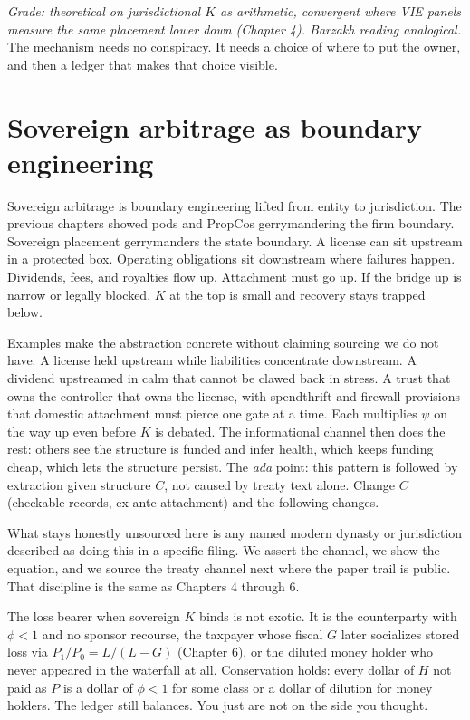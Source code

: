 \textit{Grade: theoretical on jurisdictional $K$ as arithmetic, convergent where VIE panels measure the same placement lower down (Chapter 4). Barzakh reading analogical.} The mechanism needs no conspiracy. It needs a choice of where to put the owner, and then a ledger that makes that choice visible.

\section{Sovereign arbitrage as boundary engineering}

Sovereign arbitrage is boundary engineering lifted from entity to jurisdiction. The previous chapters showed pods and PropCos gerrymandering the firm boundary. Sovereign placement gerrymanders the state boundary. A license can sit upstream in a protected box. Operating obligations sit downstream where failures happen. Dividends, fees, and royalties flow up. Attachment must go up. If the bridge up is narrow or legally blocked, $K$ at the top is small and recovery stays trapped below.

Examples make the abstraction concrete without claiming sourcing we do not have. A license held upstream while liabilities concentrate downstream. A dividend upstreamed in calm that cannot be clawed back in stress. A trust that owns the controller that owns the license, with spendthrift and firewall provisions that domestic attachment must pierce one gate at a time. Each multiplies $\psi$ on the way up even before $K$ is debated. The informational channel then does the rest: others see the structure is funded and infer health, which keeps funding cheap, which lets the structure persist. The \textit{ada} point: this pattern is followed by extraction given structure $C$, not caused by treaty text alone. Change $C$ (checkable records, ex-ante attachment) and the following changes.

What stays honestly unsourced here is any named modern dynasty or jurisdiction described as doing this in a specific filing. We assert the channel, we show the equation, and we source the treaty channel next where the paper trail is public. That discipline is the same as Chapters 4 through 6.

The loss bearer when sovereign $K$ binds is not exotic. It is the counterparty with $\phi < 1$ and no sponsor recourse, the taxpayer whose fiscal $G$ later socializes stored loss via $P_1/P_0 = L/(L-G)$ (Chapter 6), or the diluted money holder who never appeared in the waterfall at all. Conservation holds: every dollar of $H$ not paid as $P$ is a dollar of $\phi < 1$ for some class or a dollar of dilution for money holders. The ledger still balances. You just are not on the side you thought.

